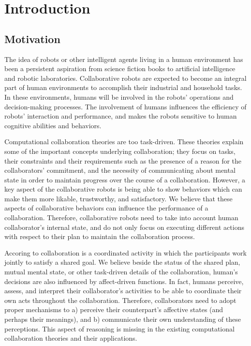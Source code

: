 \documentclass[12pt]{report}
\begin{document}
\pagebreak

\tableofcontents
\pagebreak

\listoffigures
\pagebreak

\listoftables
\pagebreak

\listofalgorithms
{}
\pagebreak


\chapter{Introduction}
\label{ch:introduction}

\section{Motivation}

The idea of robots or other intelligent agents living in a human environment has
been a persistent aspiration from science fiction books to artificial
intelligence and robotic laboratories. Collaborative robots are expected to
become an integral part of human environments to accomplish their industrial
and household tasks. In these environments, humans will be involved in
the robots' operations and decision-making processes. The involvement of humans
influences the efficiency of robots' interaction and performance, and makes the
robots sensitive to human cognitive abilities and behaviors.

Computational collaboration theories are too task-driven. These theories explain
some of the important concepts underlying collaboration; they focus on tasks,
their constraints and their requirements such as the presence of a reason for
the collaborators' commitment, and the necessity of communicating about mental
state in order to maintain progress over the course of a collaboration. However,
a key aspect of the collaborative robots is being able to show behaviors which
can make them more likable, trustworthy, and satisfactory. We believe that these
aspects of collaborative behaviors can influence the performance of a
collaboration. Therefore, collaborative robots need to take into account human
collaborator's internal state, and do not only focus on executing different
actions with respect to their plan to maintain the collaboration process.

Accoring to \cite{grosz:plans-discourse} collaboration is a coordinated activity
in which the participants work jointly to satisfy a shared goal. We believe
beside the status of the shared plan, mutual mental state, or other task-driven
details of the collaboration, human's decisions are also influenced by
affect-driven functions. In fact, humans perceive, assess, and interpret their
collaborator's activities to be able to coordinate their own acts throughout the
collaboration. Therefore, collaborators need to adopt proper mechanisms to a)
perceive their counterpart's affective states (and perhaps their meanings), and
b) communicate their own understanding of these perceptions. This aspect of
reasoning is missing in the existing computational collaboration theories and
their applications.
\end{document}
